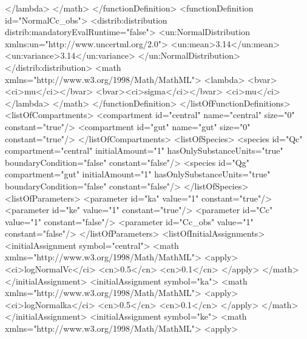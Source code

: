 \documentclass[draftspec]{sbmlpkgspec}
\begin{document}
\begin{example}
                    </lambda>
                </math>
            </functionDefinition>
            <functionDefinition id="NormalCc_obs">
                <distrib:distribution distrib:mandatoryEvalRuntime="false">
                    <un:NormalDistribution xmlns:un="http://www.uncertml.org/2.0">
                        <un:mean>3.14</un:mean>
                        <un:variance>3.14</un:variance>
                    </un:NormalDistribution>
                </distrib:distribution>
                <math xmlns="http://www.w3.org/1998/Math/MathML">
                    <lambda>
                        <bvar><ci>mu</ci></bvar>
                        <bvar><ci>sigma</ci></bvar> 
                        <ci>mu</ci>                         
                    </lambda>
                </math>
            </functionDefinition>
        </listOfFunctionDefinitions>
        <listOfCompartments>
            <compartment id="central" name="central" size="0" constant="true"/>
            <compartment id="gut" name="gut" size="0" constant="true"/>
        </listOfCompartments>
        <listOfSpecies>
            <species id="Qc" compartment="central" initialAmount="1"
               hasOnlySubstanceUnits="true" boundaryCondition="false" constant="false"/>
            <species id="Qg" compartment="gut" initialAmount="1"
               hasOnlySubstanceUnits="true" boundaryCondition="false" constant="false"/>
        </listOfSpecies>
        <listOfParameters>
            <parameter id="ka" value="1" constant="true"/>
            <parameter id="ke" value="1" constant="true"/>
            <parameter id="Cc" value="1" constant="false"/>
            <parameter id="Cc_obs" value="1" constant="false"/>
        </listOfParameters>
        <listOfInitialAssignments>
            <initialAssignment symbol="central">
                <math xmlns="http://www.w3.org/1998/Math/MathML"> 
                    <apply>
                        <ci>logNormalVc</ci>
                        <cn>0.5</cn>
                        <cn>0.1</cn>
                    </apply>
                </math>
            </initialAssignment>
            <initialAssignment symbol="ka">
                <math xmlns="http://www.w3.org/1998/Math/MathML"> 
                    <apply>
                        <ci>logNormalka</ci>
                        <cn>0.5</cn>
                        <cn>0.1</cn>
                    </apply>
                </math>
            </initialAssignment>
            <initialAssignment symbol="ke">
                <math xmlns="http://www.w3.org/1998/Math/MathML"> 
                    <apply>

\end{example}
\end{document}
